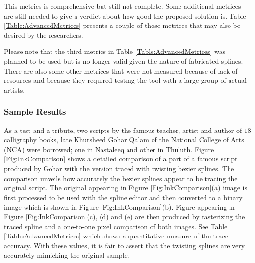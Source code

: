 This metrics is comprehensive but still not complete. Some additional metrices are still needed to give a verdict about how good the proposed solution is. Table \ref{Table:AdvancedMetrices} presents a couple of those metrices that may also be desired by the researchers.

\begin{table}[ht]
\centering
{}
\caption{Advanced metrices to gauge the effectiveness of twisting bezier splines.}
\label{Table:AdvancedMetrices}
\end{table}

Please note that the third metrics in Table \ref{Table:AdvancedMetrices} was planned to be used but is no longer valid given the nature of fabricated splines.
There are also some other metrices that were not measured because of lack of resources and because they required testing the tool with a large group of actual artists.

\subsubsection{Sample Results}
As a test and a tribute, two scripts by the famous teacher, artist and author of $18$ calligraphy books, late Khursheed Gohar Qalam \cite{bib23} of the National College of Arts (NCA) were borrowed; one in Nastaleeq and other in Thuluth. Figure \ref{Fig:InkComparison} shows a detailed comparison of a part of a famous script produced by Gohar with the version traced with twisting bezier splines. The comparison unveils how accurately the bezier splines appear to be tracing the original script. The original appearing in Figure \ref{Fig:InkComparison}(a) image is first processed to be used with the spline editor and then converted to a binary image which is shown in Figure \ref{Fig:InkComparison}(b). Figure appearing in Figure \ref{Fig:InkComparison}(c), (d) and (e) are then produced by rasterizing the traced spline and a one-to-one pixel comparison of both images. See Table \ref{Table:AdvancedMetrices} which shows a quantitative measure of the trace accuracy. With these values, it is fair to assert that the twisting splines are very accurately mimicking the original sample.

